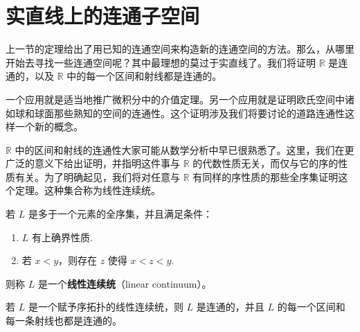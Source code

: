 \section{实直线上的连通子空间}\label{section:ch03-connected-subspaces-real}

上一节的定理给出了用已知的连通空间来构造新的连通空间的方法。那么，从哪里开始去寻找一些连通空间呢？其中最理想的莫过于实直线了。我们将证明 $\mathbb{R}$ 是连通的，以及 $\mathbb{R}$ 中的每一个区间和射线都是连通的。

一个应用就是适当地推广微积分中的介值定理。另一个应用就是证明欧氏空间中诸如球和球面那些熟知的空间的连通性。这个证明涉及我们将要讨论的道路连通性这样一个新的概念。

$\mathbb{R}$ 中的区间和射线的连通性大家可能从数学分析中早已很熟悉了。这里，我们在更广泛的意义下给出证明，并指明这件事与 $\mathbb{R}$ 的代数性质无关，而仅与它的序的性质有关。为了明确起见，我们将对任意与 $\mathbb{R}$ 有同样的序性质的那些全序集证明这个定理。这种集合称为线性连续统。

\begin{definition}\label{definition:ch03-linear-continuum}
若 $L$ 是多于一个元素的全序集，并且满足条件：
\begin{enumerate}
\item $L$ 有上确界性质.
\item 若 $x<y$，则存在 $z$ 使得 $x<z<y$.
\end{enumerate}
则称 $L$ 是一个\textbf{线性连续统}（linear continuum）。
\end{definition}

\begin{theorem}\label{theorem:ch03-linear-continuum-connected}
若 $L$ 是一个赋予序拓扑的线性连续统，则 $L$ 是连通的，并且 $L$ 的每一个区间和每一条射线也都是连通的。
\end{theorem}


